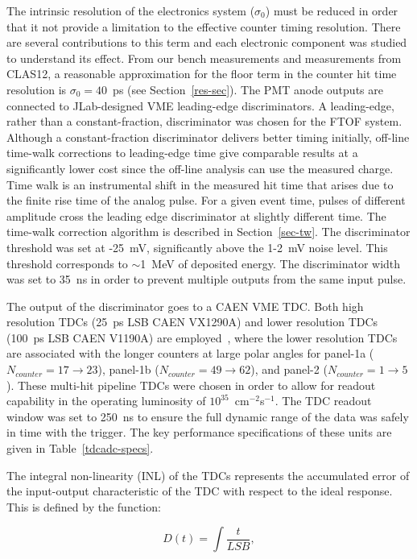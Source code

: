 \documentclass{elsart}
\begin{document}
The intrinsic resolution of the electronics system ($\sigma_0$) must be reduced in order that it not
provide a limitation to the effective counter timing resolution. There are several contributions to this
term and each electronic component was studied to understand its effect.  From our bench measurements
and measurements from CLAS12, a reasonable approximation for the floor term in the counter hit time
resolution is $\sigma_0=40$~ps (see Section~\ref{res-sec}). The PMT anode outputs are connected to
JLab-designed VME leading-edge discriminators. A leading-edge, rather than a constant-fraction,
discriminator was chosen for the FTOF system. Although a constant-fraction discriminator delivers better
timing initially, off-line time-walk corrections to leading-edge time give comparable results at a significantly
lower cost since the off-line analysis can use the measured charge. Time walk is an instrumental shift in the
measured hit time that arises due to the finite rise time of the analog pulse. For a given event time, pulses
of different amplitude cross the leading edge discriminator at slightly different time. The time-walk
correction algorithm is described in Section~\ref{sec-tw}. The discriminator threshold was set at -25~mV,
significantly above the 1-2~mV noise level. This threshold corresponds to $\sim$1~MeV of deposited
energy. The discriminator width was set to 35~ns in order to prevent multiple outputs from the same input
pulse.

The output of the discriminator goes to a CAEN VME TDC. Both high resolution TDCs (25~ps LSB CAEN
VX1290A) and lower resolution TDCs (100~ps LSB CAEN V1190A) are employed~\cite{tdc-manual}, where
the lower resolution TDCs are associated with the longer counters at large polar angles for panel-1a
($N_{counter}=17 \to 23$), panel-1b ($N_{counter}=49 \to 62$), and panel-2 ($N_{counter}=1 \to 5$). These
multi-hit pipeline TDCs were chosen in order to allow for readout capability in the operating luminosity of
$10^{35}$~cm$^{-2}$s$^{-1}$. The TDC readout window was set to 250~ns to ensure the full dynamic range
of the data was safely in time with the trigger. The key performance specifications of these units are given
in Table~\ref{tdcadc-specs}.

The integral non-linearity (INL) of the TDCs represents the accumulated error of the input-output
characteristic of the TDC with respect to the ideal response. This is defined by the function:

\begin{equation}
D(t) = \int \frac{t}{LSB},
\end{equation}
\end{document}
